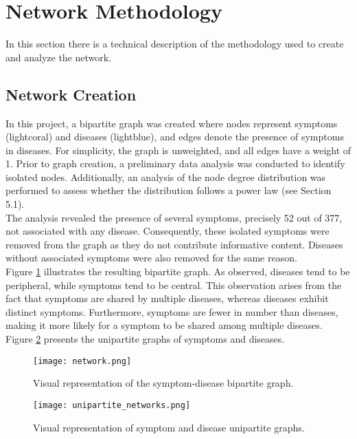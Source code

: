 \section{Network Methodology}
In this section there is a technical description of the methodology used to create and analyze the network.

\subsection{Network Creation}
In this project, a bipartite graph was created where nodes represent symptoms (lightcoral) and diseases (lightblue),
and edges denote the presence of symptoms in diseases.
For simplicity, the graph is unweighted, and all edges have a weight of 1.
Prior to graph creation, a preliminary data analysis was conducted to identify isolated nodes.
Additionally, an analysis of the node degree distribution was performed to assess whether the distribution follows a power law (see Section 5.1).\\
The analysis revealed the presence of several symptoms, precisely 52 out of 377, not associated with any disease.
Consequently, these isolated symptoms were removed from the graph as they do not contribute informative content.
Diseases without associated symptoms were also removed for the same reason.\\
Figure \ref{fig:bipartite_graph} illustrates the resulting bipartite graph. As observed, diseases tend to be peripheral,
while symptoms tend to be central. This observation arises from the fact that symptoms are shared by multiple diseases,
whereas diseases exhibit distinct symptoms. Furthermore, symptoms are fewer in number than diseases,
making it more likely for a symptom to be shared among multiple diseases.\\
Figure \ref{fig:unipartite_graphs} presents the unipartite graphs of symptoms and diseases.
\begin{figure}[H]
    \centering
    \texttt{[image: network.png]}
    \caption{Visual representation of the symptom-disease bipartite graph.}
    \label{fig:bipartite_graph}
\end{figure}
\noindent

\begin{figure}[H]
    \centering
    \texttt{[image: unipartite\_networks.png]}
    \caption{Visual representation of symptom and disease unipartite graphs.}
    \label{fig:unipartite_graphs}
\end{figure}
\noindent

